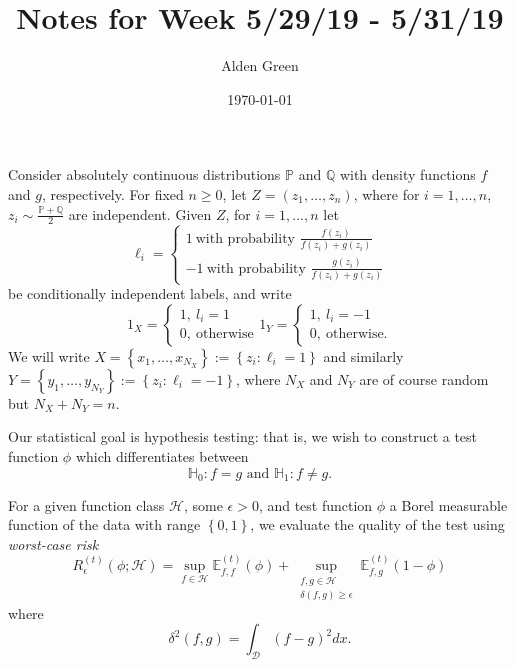 \documentclass{article}
\newcommand{\set}[1]{\left\{#1\right\}}
\newcommand{\1}{\mathbb{I}}
\newcommand{\D}{\mathcal{D}}
\newcommand{\X}{X} %
\newcommand{\Y}{Y} %
\newcommand{\Z}{Z} %
\newcommand{\Hclass}{\mathcal{H}}
\newcommand{\Pbb}{\mathbb{P}}
\newcommand{\Ebb}{\mathbb{E}}
\newcommand{\Qbb}{\mathbb{Q}}
\theoremstyle{alden}
\theoremstyle{aldenthm}
\theoremstyle{definition}
\theoremstyle{remark}
\begin{document}
\title{Notes for Week 5/29/19 - 5/31/19}
\author{Alden Green}
\date{\today}
\maketitle

Consider absolutely continuous distributions $\Pbb$ and $\Qbb$ with density functions $f$ and $g$, respectively. For fixed $n \geq 0$, let $\Z = (z_1, \ldots,z_n)$, where for $i = 1,\ldots,n$, $z_i \sim \frac{\Pbb + \Qbb}{2}$ are independent. Given $\Z$, for $i = 1,...,n$ let
\begin{equation*}
\ell_i = 
\begin{cases}
1~ \text{with probability $\frac{f(z_i)}{f(z_i) + g(z_i)}$} \\
-1~ \text{with probability $\frac{g(z_i)}{f(z_i) + g(z_i)}$}
\end{cases}
\end{equation*} 
be conditionally independent labels, and write
\begin{equation*}
1_X = 
\begin{cases}
1,~ l_i = 1\\
0,~ \text{otherwise}
\end{cases}
1_Y = 
\begin{cases}
1,~ l_i = -1 \\
0,~ \text{otherwise.}
\end{cases}
\end{equation*}
We will write $\X = \set{x_1, \ldots,x_{N_X}} := \set{z_i: \ell_i = 1}$ and similarly $\Y = \set{y_1, \ldots,y_{N_Y}} := \set{z_i: \ell_i = -1}$, where $N_X$ and $N_Y$ are of course random but $N_X + N_Y = n$. 

Our statistical goal is hypothesis testing: that is, we wish to construct a test function $\phi$ which differentiates between
\begin{equation*}
\mathbb{H}_0: f = g \text{ and } \mathbb{H}_1: f \neq g.
\end{equation*}

For a given function class $\Hclass$, some $\epsilon > 0$, and test function $\phi$ a Borel measurable function of the data with range $\set{0,1}$, we evaluate the quality of the test using \emph{worst-case risk}
\begin{equation*}
R_{\epsilon}^{(t)}(\phi; \Hclass) = \sup_{f \in \Hclass} \Ebb_{f,f}^{(t)}(\phi) + \sup_{ \substack{f,g \in \Hclass \\ \delta(f,g) \geq \epsilon } } \Ebb_{f,g}^{(t)}(1 - \phi)
\end{equation*} 
where 
\begin{equation*}
\delta^2(f,g) = \int_{\D} (f - g)^2 dx.
\end{equation*}
\end{document}
